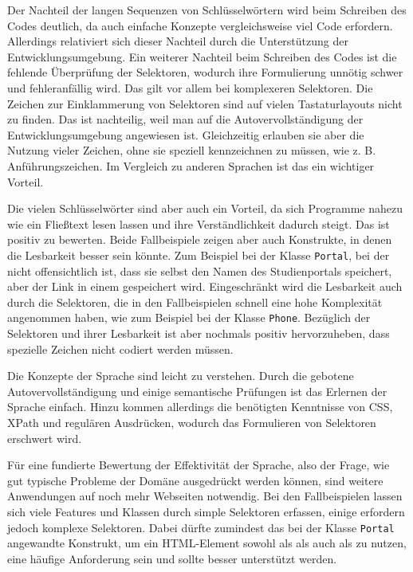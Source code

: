     Der Nachteil der langen Sequenzen von Schlüsselwörtern wird beim Schreiben des Codes
    deutlich, da auch einfache Konzepte vergleichsweise viel Code erfordern.
    Allerdings relativiert sich dieser Nachteil durch die Unterstützung der Entwicklungsumgebung.
    Ein weiterer Nachteil beim Schreiben des Codes ist die fehlende Überprüfung der
    Selektoren, wodurch ihre Formulierung unnötig schwer und fehleranfällig wird.
    Das gilt vor allem bei komplexeren Selektoren.
    Die Zeichen zur Einklammerung von Selektoren sind auf vielen Tastaturlayouts nicht zu finden.
    Das ist nachteilig, weil man auf die Autovervollständigung der Entwicklungsumgebung angewiesen ist.
    Gleichzeitig erlauben sie aber die Nutzung vieler Zeichen, ohne sie speziell kennzeichnen zu müssen,
    wie z. B. Anführungszeichen.
    Im Vergleich zu anderen Sprachen ist das ein wichtiger Vorteil.

    Die vielen Schlüsselwörter sind aber auch ein Vorteil,
    da sich Programme nahezu wie ein Fließtext lesen lassen
    und ihre Verständlichkeit dadurch steigt.
    Das ist positiv zu bewerten.
    Beide Fallbeispiele zeigen aber auch Konstrukte,
    in denen die Lesbarkeit besser sein könnte.
    Zum Beispiel bei der Klasse \texttt{Portal},
    bei der nicht offensichtlich ist,
    dass sie selbst den Namen des Studienportals speichert,
    aber der Link in einem {\childFeature} gespeichert wird.
    Eingeschränkt wird die Lesbarkeit auch durch die Selektoren,
    die in den Fallbeispielen schnell eine hohe Komplexität angenommen haben,
    wie zum Beispiel bei der Klasse \texttt{Phone}.
    Bezüglich der Selektoren und ihrer Lesbarkeit ist aber nochmals
    positiv hervorzuheben, dass spezielle Zeichen nicht codiert werden müssen.

    Die Konzepte der Sprache sind leicht zu verstehen.
    Durch die gebotene Autovervollständigung und einige
    semantische Prüfungen ist das Erlernen der Sprache einfach.
    Hinzu kommen allerdings die benötigten Kenntnisse von CSS, XPath und regulären Ausdrücken,
    wodurch das Formulieren von Selektoren erschwert wird.

    Für eine fundierte Bewertung der Effektivität der Sprache,
    also der Frage, wie gut typische Probleme der Domäne ausgedrückt werden können,
    sind weitere Anwendungen auf noch mehr Webseiten notwendig.
    Bei den Fallbeispielen lassen sich
    viele Features und Klassen durch simple Selektoren erfassen,
    einige erfordern jedoch komplexe Selektoren.
    Dabei dürfte zumindest das bei der Klasse \texttt{Portal} angewandte Konstrukt,
    um ein HTML-Element sowohl als {\contentFeature} als auch als {} zu nutzen,
    eine häufige Anforderung sein und sollte besser unterstützt werden.


